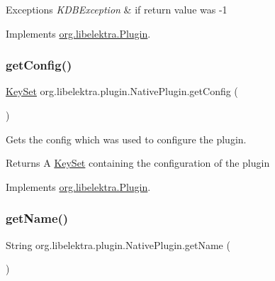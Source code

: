 \begin{DoxyExceptions}{Exceptions}
{\em K\+D\+B\+Exception} & if return value was -\/1 \\
\hline
\end{DoxyExceptions}


Implements \mbox{\hyperlink{interfaceorg_1_1libelektra_1_1Plugin_a9b8362549b7ab8ca5eff39cf6b7c8046}{org.\+libelektra.\+Plugin}}.

\mbox{\label{classorg_1_1libelektra_1_1plugin_1_1NativePlugin_af9c78565029ed2ae38241759549e4b5a}} 
\subsubsection{\texorpdfstring{getConfig()}{getConfig()}}
{\footnotesize\ttfamily \mbox{\hyperlink{classorg_1_1libelektra_1_1KeySet}{Key\+Set}} org.\+libelektra.\+plugin.\+Native\+Plugin.\+get\+Config (\begin{DoxyParamCaption}{ }\end{DoxyParamCaption})\hspace{0.3cm}{\ttfamily [inline]}}



Gets the config which was used to configure the plugin. 

\begin{DoxyReturn}{Returns}
A \mbox{\hyperlink{classorg_1_1libelektra_1_1KeySet}{Key\+Set}} containing the configuration of the plugin 
\end{DoxyReturn}


Implements \mbox{\hyperlink{interfaceorg_1_1libelektra_1_1Plugin_a95ee37a782d5bd32fd95478788652d44}{org.\+libelektra.\+Plugin}}.

\mbox{\label{classorg_1_1libelektra_1_1plugin_1_1NativePlugin_a606fc8f54bc810d874176103859976ab}} 
\subsubsection{\texorpdfstring{getName()}{getName()}}
{\footnotesize\ttfamily String org.\+libelektra.\+plugin.\+Native\+Plugin.\+get\+Name (\begin{DoxyParamCaption}{ }\end{DoxyParamCaption})\hspace{0.3cm}{\ttfamily [inline]}}



